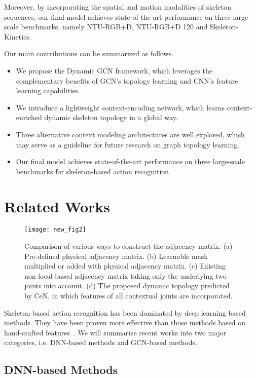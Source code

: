 \documentclass[sigconf]{acmart}
\begin{document}
Moreover, by incorporating the spatial and motion modalities of skeleton sequences, our final model achieves state-of-the-art performance on three large-scale benchmarks, namely NTU-RGB+D, NTU-RGB+D 120 and Skeleton-Kinetics.

Our main contributions can be summarized as follows.
\begin{itemize}
\item We propose the Dynamic GCN framework, which leverages the complementary benefits of GCN's topology learning and CNN's feature learning capabilities.
\item We introduce a lightweight context-encoding network, which learns context-enriched dynamic skeleton topology in a global way.
\item Three alternative context modeling architectures are well explored, which may serve as a guideline for future research on graph topology learning.
\item Our final model achieves state-of-the-art performance on three large-scale benchmarks for skeleton-based action recognition.
\end{itemize}

\section{Related Works}

\begin{figure}[t]
\centering
\texttt{[image: new\_fig2]} \caption{Comparison of various ways to construct the adjacency matrix. (a) Pre-defined physical adjacency matrix. (b) Learnable mask multiplied or added with physical adjacency matrix. (c) Existing non-local-based adjacency matrix taking only the underlying two joints into account. (d) The proposed dynamic topology predicted by CeN, in which features of all contextual joints are incorporated.}
\label{fig2}
\end{figure}

Skeleton-based action recognition has been dominated by deep learning-based methods. They have been proven more effective than those methods based on hand-crafted features~\cite{vemulapalli2014human,wang2012mining,xia2012view}. We will summarize recent works into two major categories, i.e. DNN-based methods and GCN-based methods.

\subsection{DNN-based Methods}
\end{document}
